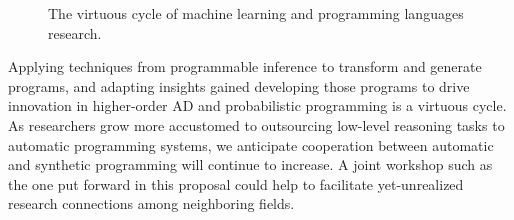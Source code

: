 \documentclass{article}
\begin{document}
    \pagebreak

    \begin{figure}[H]
        \centering
        \caption{The virtuous cycle of machine learning and programming languages research.}
    \end{figure}

    Applying techniques from programmable inference to transform and generate programs, and adapting insights gained developing those programs to drive innovation in higher-order AD and probabilistic programming is a virtuous cycle. As researchers grow more accustomed to outsourcing low-level reasoning tasks to automatic programming systems, we anticipate cooperation between automatic and synthetic programming will continue to increase.  A joint workshop such as the one put forward in this proposal could help to facilitate yet-unrealized research connections among neighboring fields.


\end{document}
